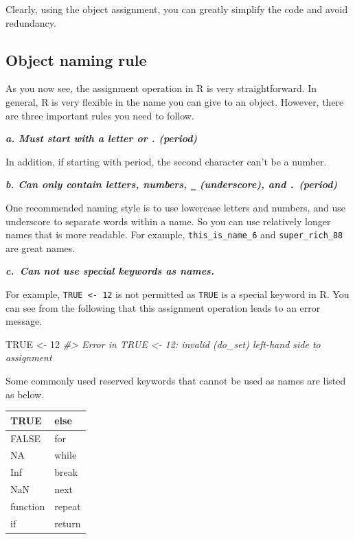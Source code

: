 \documentclass[
]{book}
\newenvironment{Shaded}{\begin{snugshade}}{\end{snugshade}}
\newcommand{\CommentTok}[1]{\textcolor[rgb]{0.56,0.35,0.01}{\textit{#1}}}
\newcommand{\ConstantTok}[1]{\textcolor[rgb]{0.00,0.00,0.00}{#1}}
\newcommand{\DecValTok}[1]{\textcolor[rgb]{0.00,0.00,0.81}{#1}}
\newcommand{\OtherTok}[1]{\textcolor[rgb]{0.56,0.35,0.01}{#1}}
\begin{document}
Clearly, using the object assignment, you can greatly simplify the code and avoid redundancy.

\hypertarget{Naming}{%
\subsection{Object naming rule}\label{Naming}}

As you now see, the assignment operation in R is very straightforward. In general, R is very flexible in the name you can give to an object. However, there are three important rules you need to follow.

\textbf{\emph{a. Must start with a letter or . (period)}}

In addition, if starting with period, the second character can't be a number.

\textbf{\emph{b. Can only contain letters, numbers, \texttt{\_} (underscore), and \texttt{.} (period)}}

One recommended naming style is to use lowercase letters and numbers, and use underscore to separate words within a name. So you can use relatively longer names that is more readable. For example, \texttt{this\_is\_name\_6} and \texttt{super\_rich\_88} are great names.

\textbf{\emph{c.~Can not use special keywords as names.}}

For example, \texttt{TRUE\ \textless{}-\ 12} is not permitted as \texttt{TRUE} is a special keyword in R. You can see from the following that this assignment operation leads to an error message.

\begin{Shaded}
\begin{Highlighting}[]
\ConstantTok{TRUE} \OtherTok{\textless{}{-}} \DecValTok{12}
\CommentTok{\#\textgreater{} Error in TRUE \textless{}{-} 12: invalid (do\_set) left{-}hand side to assignment}
\end{Highlighting}
\end{Shaded}

Some commonly used reserved keywords that cannot be used as names are listed as below.

\begin{tabular}{l|l}
\hline
TRUE & else\\
\hline
FALSE & for\\
\hline
NA & while\\
\hline
Inf & break\\
\hline
NaN & next\\
\hline
function & repeat\\
\hline
if & return\\
\hline
\end{tabular}
\end{document}
